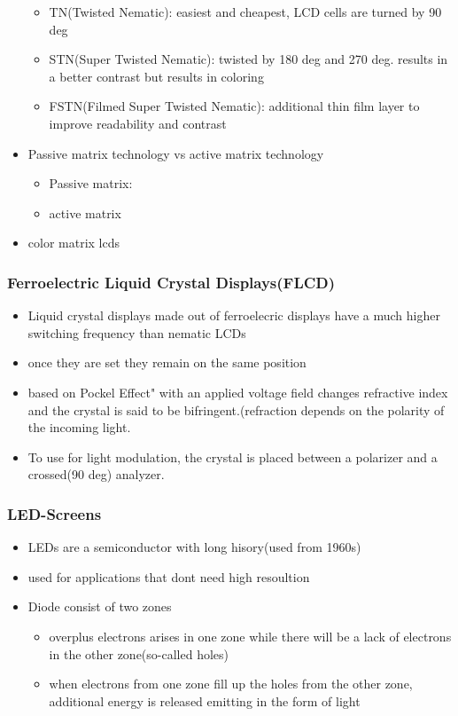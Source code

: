 \documentclass{standalone}
\begin{document}
\begin{itemize}
\begin{itemize}
\item TN(Twisted Nematic): easiest and cheapest, LCD cells are turned by 90 deg
\item STN(Super Twisted Nematic): twisted by 180 deg and 270 deg. results in a better contrast but results in coloring
\item FSTN(Filmed Super Twisted Nematic): additional thin film layer to improve readability and contrast
\end{itemize}
\item Passive matrix technology vs active matrix technology
\begin{itemize}
\item Passive matrix:
\item active matrix
\end{itemize}
\item color matrix lcds
\end{itemize}

\subsubsection*{Ferroelectric Liquid Crystal Displays(FLCD)}
\begin{itemize}
\item Liquid crystal displays made out of ferroelecric displays have a much higher switching frequency than nematic LCDs
\item once they are set they remain on the same position
\item based on Pockel Effect" with an applied voltage field changes refractive index and the crystal is said to be bifringent.(refraction depends on the polarity of the incoming light.
\item To use for light modulation, the crystal is placed between a polarizer and a crossed(90 deg) analyzer.
\end{itemize}
\subsubsection*{LED-Screens}
\begin{itemize}
\item LEDs are a semiconductor with long hisory(used from 1960s)
\item used for applications that dont need high resoultion
\item Diode consist of two zones
\begin{itemize}
\item overplus electrons arises in one zone while there will be a lack of electrons in the other zone(so-called holes)
\item when electrons from one zone fill up the holes from the other zone, additional energy is released emitting in the form of light
\end{itemize}
\end{itemize}
\end{document}
